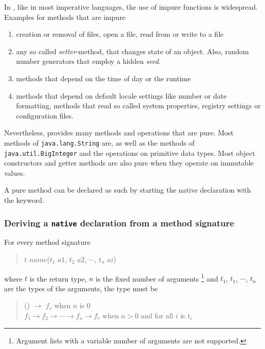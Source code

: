 In \java{}, like in most imperative languages, the use of impure functions is widespread.
Examples for methods that are impure
\begin{enumerate}
\item creation or removal of files, open a file, read from or write to a file
\item any so called \emph{setter}-method, that changes state of an object. Also, random number generators that employ a hidden \emph {seed}.
\item methods that depend on the time of day or the runtime
\item methods that depend on default locale settings like number or date formatting, methods that read so called system properties, registry settings or configuration files.
\end{enumerate}

Nevertheless, \java{} provides many methods and operations that are pure. Most methods of {\tt java.lang.String} are, as well as the methods of \texttt{java.util.BigInteger} and the operations on primitive data types. Most object constructors and getter methods are also pure when they 
operate on immutable values.

A pure \java{} method can be declared as such by starting the native declaration with the  keyword.


\subsubsection{Deriving a \frege{} \texttt{native} declaration from a \java{} method signature}

For every \java{} method signature

\begin{quote}
\begin{flushleft}
$t$ $name$($t_1$ $a1$, $t_2$ $a2$, $\cdots$, $t_n$ $ai$)
\end{flushleft}
\end{quote}

where $t$ is the return type, $n$ is the fixed number of arguments
\footnote{Argument lists with a variable number of arguments are not supported.}
 and $t_1$, $t_1$, $\cdots$, $t_n$  are the types of the arguments, the \frege{} type must be

\begin{quote}
\begin{flushleft}
() $ \rightarrow{}$ $f_r$  when $n$ is 0\\
$f_1  \rightarrow{} f_2  \rightarrow{}\cdots \rightarrow{}  f_n  \rightarrow{} f_r$  when $n>0$ and for all $i$  is $t_i$\\
\end{flushleft}
\end{quote}

